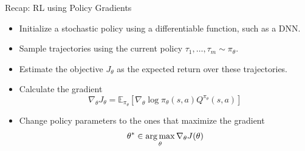 \documentclass[aspectratio=169]{../latex_main/tntbeamer}  %
\begin{document}
\begin{frame}[c]{Recap: RL using Policy Gradients}
	
\begin{itemize}
    \item Initialize a stochastic policy using a differentiable function, such as a DNN.
    \item Sample trajectories using the current policy $\tau_1 , \dots , \tau_m \sim \pi_\theta$.
    \item Estimate the objective $J_\theta$ as the expected return over these trajectories.
    \item Calculate the gradient 
        $$\nabla_\theta J_\theta = \mathbb{E}_{\pi_\theta} [\nabla_\theta \log \pi_\theta(s,a) Q^{\pi_\theta}(s,a)]$$
    \item Change policy parameters to the ones that maximize the gradient 
        $$\theta^* \in \operatorname*{arg\,max}_\theta \nabla_\theta J(\theta)$$
\end{itemize}
	
\end{frame}
\end{document}
